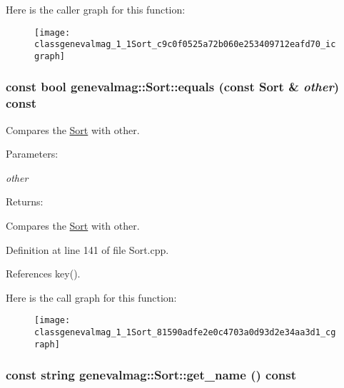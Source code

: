 Here is the caller graph for this function:\nopagebreak
\begin{figure}[H]
\begin{center}
\leavevmode
\texttt{[image: classgenevalmag\_1\_1Sort\_c9c0f0525a72b060e253409712eafd70\_icgraph]}
\end{center}
\end{figure}
\hypertarget{classgenevalmag_1_1Sort_81590adfe2e0c4703a0d93d2e34aa3d1}{
\subsubsection[{equals}]{\setlength{\rightskip}{0pt plus 5cm}const bool genevalmag::Sort::equals (const {\bf Sort} \& {\em other}) const}}
\label{classgenevalmag_1_1Sort_81590adfe2e0c4703a0d93d2e34aa3d1}


Compares the \hyperlink{classgenevalmag_1_1Sort}{Sort} with other. \begin{Desc}
\item[Parameters:]
\begin{description}
\item[{\em other}]\end{description}
\end{Desc}
\begin{Desc}
\item[Returns:]\end{Desc}
Compares the \hyperlink{classgenevalmag_1_1Sort}{Sort} with other. 

Definition at line 141 of file Sort.cpp.

References key().

Here is the call graph for this function:\nopagebreak
\begin{figure}[H]
\begin{center}
\leavevmode
\texttt{[image: classgenevalmag\_1\_1Sort\_81590adfe2e0c4703a0d93d2e34aa3d1\_cgraph]}
\end{center}
\end{figure}
\hypertarget{classgenevalmag_1_1Sort_5bbccf82148fea12f958bd276a009fd4}{
\subsubsection[{get\_\-name}]{\setlength{\rightskip}{0pt plus 5cm}const string genevalmag::Sort::get\_\-name () const}}
\label{classgenevalmag_1_1Sort_5bbccf82148fea12f958bd276a009fd4}


